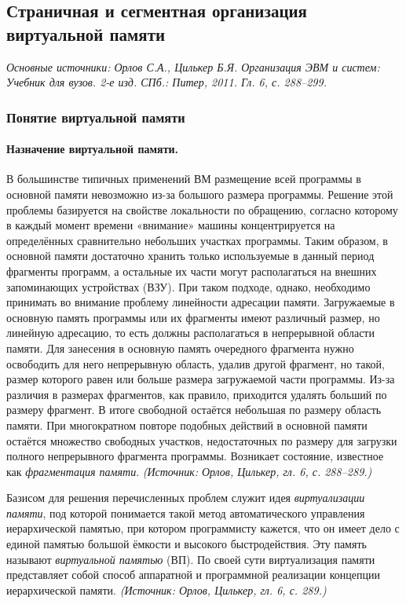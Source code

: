 \documentclass[a4paper,12pt]{article}
\begin{document}
\subsection{Страничная и сегментная организация виртуальной памяти}

\noindent\textit{Основные источники: Орлов С.А., Цилькер Б.Я. Организация ЭВМ и систем: Учебник для вузов. 2-е изд. СПб.: Питер, 2011. Гл. 6, с. 288--299.}

\subsubsection{Понятие виртуальной памяти}

\paragraph{Назначение виртуальной памяти.}
В большинстве типичных применений ВМ размещение всей программы в основной памяти невозможно из-за большого размера программы. Решение этой проблемы базируется на свойстве локальности по обращению, согласно которому в каждый момент времени «внимание» машины концентрируется на определённых сравнительно небольших участках программы. Таким образом, в основной памяти достаточно хранить только используемые в данный период фрагменты программ, а остальные их части могут располагаться на внешних запоминающих устройствах (ВЗУ). При таком подходе, однако, необходимо принимать во внимание проблему линейности адресации памяти. Загружаемые в основную память программы или их фрагменты имеют различный размер, но линейную адресацию, то есть должны располагаться в непрерывной области памяти. Для занесения в основную память очередного фрагмента нужно освободить для него непрерывную область, удалив другой фрагмент, но такой, размер которого равен или больше размера загружаемой части программы. Из-за различия в размерах фрагментов, как правило, приходится удалять больший по размеру фрагмент. В итоге свободной остаётся небольшая по размеру область памяти. При многократном повторе подобных действий в основной памяти остаётся множество свободных участков, недостаточных по размеру для загрузки полного непрерывного фрагмента программы. Возникает состояние, известное как \emph{фрагментация памяти}.
\textit{(Источник: Орлов, Цилькер, гл. 6, с. 288--289.)}

Базисом для решения перечисленных проблем служит идея \emph{виртуализации памяти}, под которой понимается такой метод автоматического управления иерархической памятью, при котором программисту кажется, что он имеет дело с единой памятью большой ёмкости и высокого быстродействия. Эту память называют \emph{виртуальной памятью} (ВП). По своей сути виртуализация памяти представляет собой способ аппаратной и программной реализации концепции иерархической памяти.
\textit{(Источник: Орлов, Цилькер, гл. 6, с. 289.)}
\end{document}
